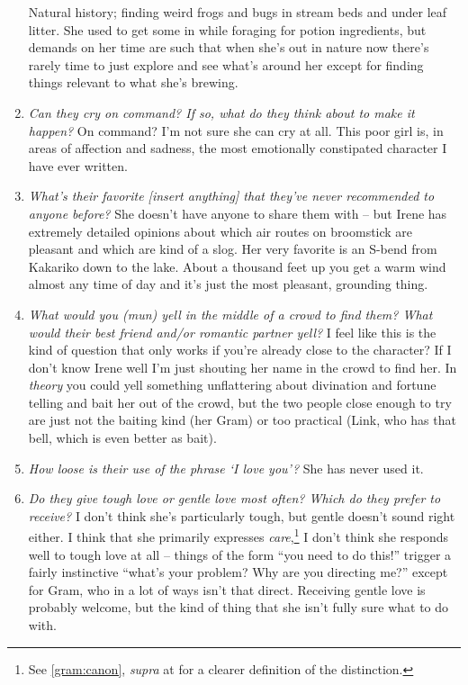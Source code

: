 \begin{enumerate}
      Natural history; finding weird frogs and bugs in stream beds and under leaf litter. She used to get some in while foraging for potion ingredients, but demands on her time are such that when she's out in nature now there's rarely time to just explore and see what's around her except for finding things relevant to what she's brewing.
    \item \label{irene:characterq:emotionallyconstipated}\textit{Can they cry on command? If so, what do they think about to make it happen?}
      On command? I'm not sure she can cry at all. This poor girl is, in areas of affection and sadness, the most emotionally constipated character I have ever written.
    \item \textit{What’s their favorite [insert anything] that they’ve never recommended to anyone before?}
      She doesn't have anyone to share them with -- but Irene has extremely detailed opinions about which air routes on broomstick are pleasant and which are kind of a slog. Her very favorite is an S-bend from Kakariko down to the lake. About a thousand feet up you get a warm wind almost any time of day and it's just the most pleasant, grounding thing.
    \item \textit{What would you (mun) yell in the middle of a crowd to find them? What would their best friend and/or romantic partner yell?}
      I feel like this is the kind of question that only works if you're already close to the character? If I don't know Irene well I'm just shouting her name in the crowd to find her. In \emph{theory} you could yell something unflattering about divination and fortune telling and bait her out of the crowd, but the two people close enough to try are just not the baiting kind (her Gram) or too practical (Link, who has that bell, which is even better as bait).
    \item \textit{How loose is their use of the phrase ‘I love you’?}\label{irene:characterq:iloveyou}
      She has never used it.
    \item \textit{Do they give tough love or gentle love most often? Which do they prefer to receive?}\label{irene:characterq:toughlove}
      I don't think she's particularly tough, but gentle doesn't sound right either. I think that she primarily expresses \emph{care},\footnote{See \ref{gram:canon}, \textit{supra} at \pageref{gram:canon} for a clearer definition of the distinction.} I don't think she responds well to tough love at all -- things of the form ``you need to do this!'' trigger a fairly instinctive ``what's your problem? Why are you directing me?'' except for Gram, who in a lot of ways isn't that direct. Receiving gentle love is probably welcome, but the kind of thing that she isn't fully sure what to do with. 

\end{enumerate}
